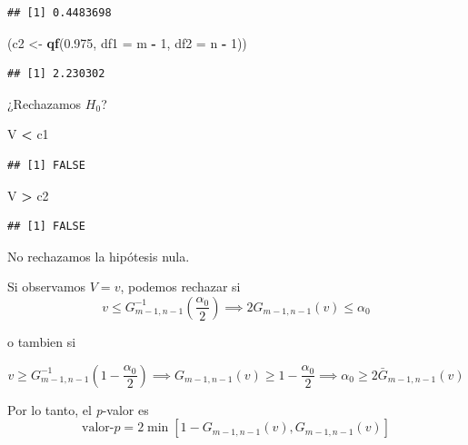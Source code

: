 \documentclass[
  12pt,
]{book}
\newenvironment{Shaded}{\begin{snugshade}}{\end{snugshade}}
\newcommand{\DataTypeTok}[1]{\textcolor[rgb]{0.13,0.29,0.53}{#1}}
\newcommand{\DecValTok}[1]{\textcolor[rgb]{0.00,0.00,0.81}{#1}}
\newcommand{\FloatTok}[1]{\textcolor[rgb]{0.00,0.00,0.81}{#1}}
\newcommand{\KeywordTok}[1]{\textcolor[rgb]{0.13,0.29,0.53}{\textbf{#1}}}
\newcommand{\NormalTok}[1]{#1}
\newcommand{\OperatorTok}[1]{\textcolor[rgb]{0.81,0.36,0.00}{\textbf{#1}}}
\newcommand{\StringTok}[1]{\textcolor[rgb]{0.31,0.60,0.02}{#1}}
\begin{document}
\begin{verbatim}
## [1] 0.4483698
\end{verbatim}

\begin{Shaded}
\begin{Highlighting}[]
\NormalTok{(c2 \textless{}{-}}\StringTok{ }\KeywordTok{qf}\NormalTok{(}\FloatTok{0.975}\NormalTok{, }\DataTypeTok{df1 =}\NormalTok{ m }\OperatorTok{{-}}\StringTok{ }\DecValTok{1}\NormalTok{, }\DataTypeTok{df2 =}\NormalTok{ n }\OperatorTok{{-}}\StringTok{ }\DecValTok{1}\NormalTok{))}
\end{Highlighting}
\end{Shaded}

\begin{verbatim}
## [1] 2.230302
\end{verbatim}

¿Rechazamos \(H_0\)?

\begin{Shaded}
\begin{Highlighting}[]
\NormalTok{V }\OperatorTok{\textless{}}\StringTok{ }\NormalTok{c1}
\end{Highlighting}
\end{Shaded}

\begin{verbatim}
## [1] FALSE
\end{verbatim}

\begin{Shaded}
\begin{Highlighting}[]
\NormalTok{V }\OperatorTok{\textgreater{}}\StringTok{ }\NormalTok{c2}
\end{Highlighting}
\end{Shaded}

\begin{verbatim}
## [1] FALSE
\end{verbatim}

No rechazamos la hipótesis nula.

Si observamos \(V=v\), podemos rechazar si\\
\[
v\leq G^{-1}_{m-1,n-1}\left(\dfrac{\alpha_0}2\right) \implies 2G_{m-1,n-1}(v)\leq \alpha_0
\]

o tambien si

\[v\geq G^{-1}_{m-1,n-1}\left(1-\dfrac{\alpha_0}2 \right) \implies G_{m-1,n-1}(v) \geq 1-\dfrac{\alpha_0}2 \implies \alpha_0\geq 2\bar G_{m-1,n-1}(v) \]

Por lo tanto, el \emph{p}-valor es
\[\text{valor-}p = 2\min[1-G_{m-1,n-1}(v), G_{m-1,n-1}(v)]\]
\end{document}
